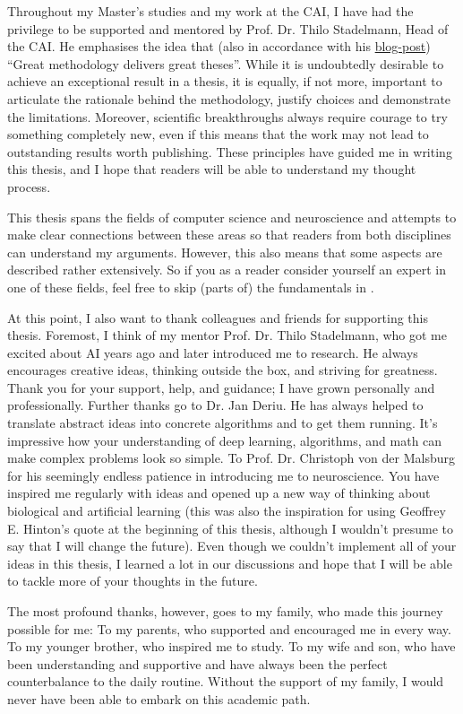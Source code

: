 Throughout my Master's studies and my work at the CAI, I  have had the privilege to be supported and mentored by Prof. Dr. Thilo Stadelmann, Head of the CAI.
He emphasises the idea that (also in accordance with his \href{https://stdm.github.io/Great-methodology-delivers-great-theses/}{blog-post}) ``Great methodology delivers great theses''.
While it is undoubtedly desirable to achieve an exceptional result in a thesis, it is equally, if not more, important to articulate the rationale behind the methodology, justify choices and demonstrate the limitations. 
Moreover, scientific breakthroughs always require courage to try something completely new, even if this means that the work may not lead to outstanding results worth publishing.
These principles have guided me in writing this thesis, and I hope that readers will be able to understand my thought process.

This thesis spans the fields of computer science and neuroscience and attempts to make clear connections between these areas so that readers from both disciplines can understand my arguments. 
However, this also means that some aspects are described rather extensively.
So if you as a reader consider yourself an expert in one of these fields, feel free to skip (parts of) the fundamentals in .

At this point, I also want to thank colleagues and friends for supporting this thesis.
Foremost, I think of my mentor Prof. Dr. Thilo Stadelmann, who got me excited about AI years ago and later introduced me to research.
He always encourages creative ideas, thinking outside the box, and striving for greatness.
Thank you for your support, help, and guidance; I have grown personally and professionally.
Further thanks go to Dr. Jan Deriu. 
He has always helped to translate abstract ideas into concrete algorithms and to get them running.
It's impressive how your understanding of deep learning, algorithms, and math can make complex problems look so simple.
To Prof. Dr. Christoph von der Malsburg for his seemingly endless patience in introducing me to neuroscience.
You have inspired me regularly with ideas and opened up a new way of thinking about biological and artificial learning (this was also the inspiration for using Geoffrey E. Hinton's quote at the beginning of this thesis, although I wouldn't presume to say that I will change the future).
Even though we couldn't implement all of your ideas in this thesis, I learned a lot in our discussions and hope that I will be able to tackle more of your thoughts in the future.

The most profound thanks, however, goes to my family, who made this journey possible for me:
To my parents, who supported and encouraged me in every way.
To my younger brother, who inspired me to study.
To my wife and son, who have been understanding and supportive and have always been the perfect counterbalance to the daily routine.
Without the support of my family, I would never have been able to embark on this academic path.
\normalsize

